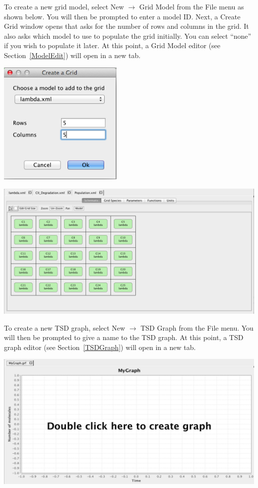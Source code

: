 \documentclass[titlepage,11pt]{article}
\begin{document}
To create a new grid model, select New $\rightarrow$ Grid Model from the File menu as shown below. You will then be prompted to enter a model ID.  Next, a Create Grid window opens that asks for the number of rows and columns in the grid.  It also asks which model to use to populate the grid initially.  You can select ``none'' if you wish to populate it later.  At this point, a Grid Model editor (see Section~\ref{ModelEdit}) will open in a new tab.  

\begin{center}
\includegraphics[width=60mm]{screenshots/createGrid}
\end{center}

\begin{center}
\includegraphics[width=160mm]{screenshots/gridModel}
\end{center}

To create a new TSD graph, select New $\rightarrow$ TSD Graph from the File menu. You will then be prompted to give a name to the TSD graph.  At this point, a TSD graph editor (see Section~\ref{TSDGraph}) will open in a new tab. 

\begin{center}
\includegraphics[width=160mm]{screenshots/TopTSDgraph}
\end{center}
\end{document}
